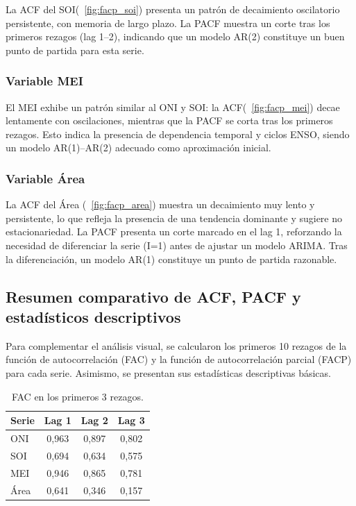 La ACF del SOI(~\ref{fig:facp_soi}) presenta un patrón de decaimiento oscilatorio persistente, con memoria de 
largo plazo. La PACF muestra un corte tras los primeros rezagos (lag 1–2), indicando que 
un modelo AR(2) constituye un buen punto de partida para esta serie.

\subsubsection{Variable MEI}

El MEI exhibe un patrón similar al ONI y SOI: la ACF(~\ref{fig:facp_mei}) decae lentamente con oscilaciones, 
mientras que la PACF se corta tras los primeros rezagos. Esto indica la presencia de 
dependencia temporal y ciclos ENSO, siendo un modelo AR(1)–AR(2) adecuado como 
aproximación inicial.

\subsubsection{Variable Área}

La ACF del Área (~\ref{fig:facp_area}) muestra un decaimiento muy lento y persistente, lo que refleja la 
presencia de una tendencia dominante y sugiere no estacionariedad. La PACF presenta un 
corte marcado en el lag 1, reforzando la necesidad de diferenciar la serie (I=1) antes de 
ajustar un modelo ARIMA. Tras la diferenciación, un modelo AR(1) constituye un punto de 
partida razonable.

\subsection{Resumen comparativo de ACF, PACF y estadísticos descriptivos}

Para complementar el análisis visual, se calcularon los primeros 10 rezagos de la función 
de autocorrelación (FAC) y la función de autocorrelación parcial (FACP) para cada serie. 
Asimismo, se presentan sus estadísticas descriptivas básicas. 

\begin{table}[H]
    \centering
    \caption{FAC en los primeros 3 rezagos.}
    \label{tab:fac}
    \begin{tabular}{lccc}
        \toprule
        \textbf{Serie} & \textbf{Lag 1} & \textbf{Lag 2} & \textbf{Lag 3} \\
        \midrule
        ONI  & 0,963 & 0,897 & 0,802 \\
        SOI  & 0,694 & 0,634 & 0,575 \\
        MEI  & 0,946 & 0,865 & 0,781 \\
        Área & 0,641 & 0,346 & 0,157 \\
        \bottomrule
    \end{tabular}
\end{table}

